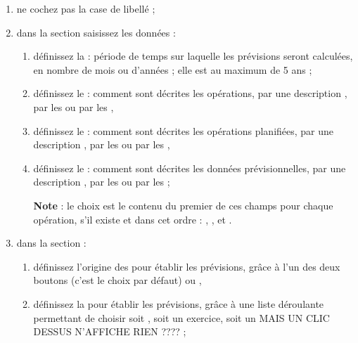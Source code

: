 \begin{enumerate}
	\item ne cochez pas la case de libellé  ;	 
	\item dans la section  saisissez les données :	
		\begin{enumerate}	
			\item définissez la  : période de temps sur laquelle les prévisions seront calculées, en nombre de mois ou d'années ; elle est au maximum de 5 ans ; 
			\item définissez le  : comment sont décrites les opérations, par une description , par les  ou par les ,
			\item définissez le  : comment sont décrites les opérations planifiées, par une description , par les  ou par les ,		
			\item définissez le  : comment sont décrites les données prévisionnelles, par une description , par les  ou par les  ; %
			
			\textbf{Note} : le choix  est le contenu du premier de ces champs pour chaque opération, s'il existe et dans cet ordre : , ,  et .
		\end{enumerate}			
	\item dans la section  :
		\begin{enumerate}	
			\item définissez l'origine des  pour établir les prévisions, grâce à l'un des deux boutons  (c'est le choix par défaut) ou ,
			\item définissez la  pour établir les prévisions, grâce à une liste déroulante permettant de choisir soit , soit un exercice, soit un  MAIS UN CLIC DESSUS N'AFFICHE RIEN ???? ; %
			

\end{enumerate}
\end{enumerate}
